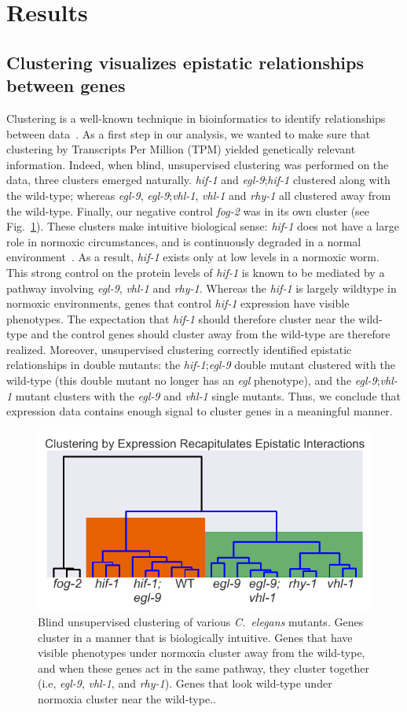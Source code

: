 \documentclass[9pt,twocolumn,twoside]{pnas-new}
\newcommand{\cel}{\emph{C.~elegans}}
\newcommand{\egl}{\emph{egl-9}}
\newcommand{\rhy}{\emph{rhy-1}}
\newcommand{\vhl}{\emph{vhl-1}}
\newcommand{\hif}{\emph{hif-1}}
\newcommand{\fog}{\emph{fog-2}}
\begin{document}
\section*{Results}
\subsection{Clustering visualizes epistatic relationships between genes}
\label{sub:Clustering}

Clustering is a well-known technique in bioinformatics to identify relationships between data~\cite{}. As a first step in our analysis, we wanted to make sure that clustering by Transcripts Per Million (TPM) yielded genetically relevant information. Indeed, when blind, unsupervised clustering was performed on the data, three clusters emerged naturally. \hif{} and \egl{};\hif{} clustered along with the wild-type; whereas \egl{}, \egl{};\vhl{}, \vhl{} and \rhy{} all clustered away from the wild-type. Finally, our negative control \fog{} was in its own cluster (see Fig.~\ref{fig:dendrogram}). These clusters make intuitive biological sense:
\hif{} does not have a large role in normoxic circumstances, and is continuously degraded in a normal environment~\cite{}. As a result, \hif{} exists only at low levels in a normoxic worm. This strong control on the protein levels of \hif{} is known to be mediated by a pathway involving \egl{}, \vhl{} and \rhy{}\cite{}. Whereas the \hif{} is largely wildtype in normoxic environments, genes that control \hif{} expression have visible phenotypes. The expectation that \hif{} should therefore cluster near the wild-type and the control genes should cluster away from the wild-type are therefore realized. Moreover, unsupervised clustering correctly identified epistatic relationships in double mutants: the \hif{};\egl{} double mutant clustered with the wild-type (this double mutant no longer has an \emph{egl} phenotype), and the \egl{};\vhl{} mutant clusters with the \egl{} and \vhl{} single mutants.
Thus, we conclude that expression data contains enough signal to cluster genes in a meaningful manner.

\begin{figure}%
\centering
\includegraphics[width=.8\linewidth]{figs/dendrogram.pdf}
\caption{Blind unsupervised clustering of various \cel{} mutants. Genes cluster in a manner that is biologically intuitive. Genes that have visible phenotypes under normoxia cluster away from the wild-type, and when these genes act in the same pathway, they cluster together (i.e, \egl{}, \vhl{}, and \rhy{}). Genes that look wild-type under normoxia cluster near the wild-type..}
\label{fig:dendrogram}
\end{figure}
\end{document}
